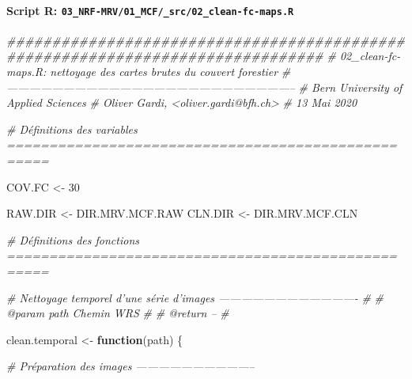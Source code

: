 \documentclass[a4paper, notitlepage, 12pt, krantz2]{krantz}
\newenvironment{Shaded}{\begin{snugshade}}{\end{snugshade}}
\newcommand{\CommentTok}[1]{\textcolor[rgb]{0.56,0.35,0.01}{\textit{#1}}}
\newcommand{\ControlFlowTok}[1]{\textcolor[rgb]{0.13,0.29,0.53}{\textbf{#1}}}
\newcommand{\DecValTok}[1]{\textcolor[rgb]{0.00,0.00,0.81}{#1}}
\newcommand{\NormalTok}[1]{#1}
\newcommand{\StringTok}[1]{\textcolor[rgb]{0.31,0.60,0.02}{#1}}
\let\oldparagraph\paragraph
\renewcommand{\paragraph}[1]{\oldparagraph{#1}\mbox{}}
\begin{document}
\hypertarget{script-r-03_nrf-mrv01_mcf_src02_clean-fc-maps.r}{%
\paragraph{\texorpdfstring{Script R: \texttt{03\_NRF-MRV/01\_MCF/\_src/02\_clean-fc-maps.R}}{Script R: 03\_NRF-MRV/01\_MCF/\_src/02\_clean-fc-maps.R}}\label{script-r-03_nrf-mrv01_mcf_src02_clean-fc-maps.r}}

\begin{Shaded}
\begin{Highlighting}[]
\CommentTok{###############################################################################}
\CommentTok{# 02_clean-fc-maps.R: nettoyage des cartes brutes du couvert forestier}
\CommentTok{# -----------------------------------------------------------------------------}
\CommentTok{# Bern University of Applied Sciences}
\CommentTok{# Oliver Gardi, <oliver.gardi@bfh.ch>}
\CommentTok{# 13 Mai 2020}


\CommentTok{# Définitions des variables ===================================================}

\NormalTok{COV.FC         <-}\StringTok{ }\DecValTok{30}

\NormalTok{RAW.DIR <-}\StringTok{ }\NormalTok{DIR.MRV.MCF.RAW}
\NormalTok{CLN.DIR <-}\StringTok{ }\NormalTok{DIR.MRV.MCF.CLN}

\CommentTok{# Définitions des fonctions ===================================================}

\CommentTok{# Nettoyage temporel d'une série d'images -------------------------------------}
\CommentTok{#}
\CommentTok{# @param path  Chemin WRS}
\CommentTok{#}
\CommentTok{# @return       -- }
\CommentTok{#}

\NormalTok{clean.temporal <-}\StringTok{ }\ControlFlowTok{function}\NormalTok{(path) \{}

  \CommentTok{# Préparation des images --------------------------------}
  

\end{Highlighting}
\end{Shaded}
\end{document}
